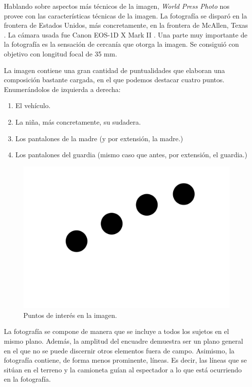 \documentclass[11pt]{article}
\begin{document}
Hablando sobre aspectos más técnicos de la imagen, \textit{World Press Photo} \cite{moore-2018} nos provee con las características técnicas de la imagen. La fotografía se disparó en la frontera de Estados Unidos, más concretamente, en la frontera de McAllen, Texas \cite{moore-2018}. La cámara usada fue Canon EOS-1D X Mark II \cite{canon}. Una parte muy importante de la fotografía es la sensación de cercanía que otorga la imagen. Se consiguió con objetivo con longitud focal de 35 mm. \newline

La imagen contiene una gran cantidad de puntualidades que elaboran una composición bastante cargada, en el que podemos destacar cuatro puntos. Enumerándolos de izquierda a derecha:
\begin{enumerate}
	\item El vehículo.
	\item La niña, más concretamente, su sudadera.
	\item Los pantalones de la madre (y por extensión, la madre.)
	\item Los pantalones del guardia (mismo caso que antes, por extensión, el guardia.)
\end{enumerate}

\begin{figure}[H]
	\includegraphics[scale = 0.3]{Images/dot.png}
	\caption{Puntos de interés en la imagen.}
\end{figure}

La fotografía se compone de manera que se incluye a todos los sujetos en el mismo plano. Además, la amplitud del encuadre demuestra ser un plano general en el que no se puede discernir otros elementos fuera de campo. Asimismo, la fotografía contiene, de forma menos prominente, líneas. Es decir, las líneas que se sitúan en el terreno y la camioneta guían al espectador a lo que está ocurriendo en la fotografía. \newline 
\end{document}
